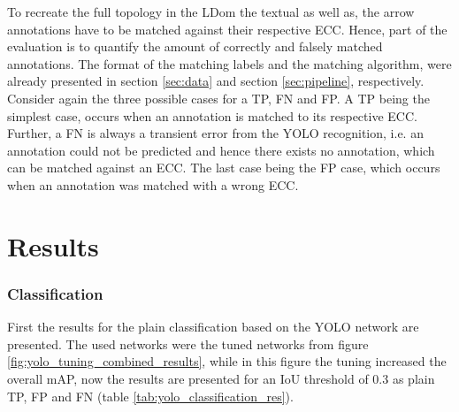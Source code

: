 To recreate the full topology in the \ac{LDom} the textual as well as, the arrow annotations have to be matched against their respective \ac{ECC}.
Hence, part of the evaluation is to quantify the amount of correctly and falsely matched annotations.
The format of the matching labels and the matching algorithm, were already presented in section \ref{sec:data} and section \ref{sec:pipeline}, respectively.
Consider again the three possible cases for a \ac{TP}, \ac{FN} and \ac{FP}.
A \ac{TP} being the simplest case, occurs when an annotation is matched to its respective \ac{ECC}.
Further, a \ac{FN} is always a transient error from the YOLO recognition, i.e. an annotation could not be predicted and hence there exists no annotation, which can be matched against an \ac{ECC}.
The last case being the \ac{FP} case, which occurs when an annotation was matched with a wrong \ac{ECC}.

\section{Results}
\label{sec:evaluation_results}

\subsubsection{Classification}
First the results for the plain classification based on the \ac{YOLO} network are presented.
The used networks were the tuned networks from figure \ref{fig:yolo_tuning_combined_results}, while in this figure the tuning increased the overall \ac{mAP}, now the results are presented for an \ac{IoU} threshold of 0.3 as plain \ac{TP}, \ac{FP} and \ac{FN} (table \ref{tab:yolo_classification_res}).

